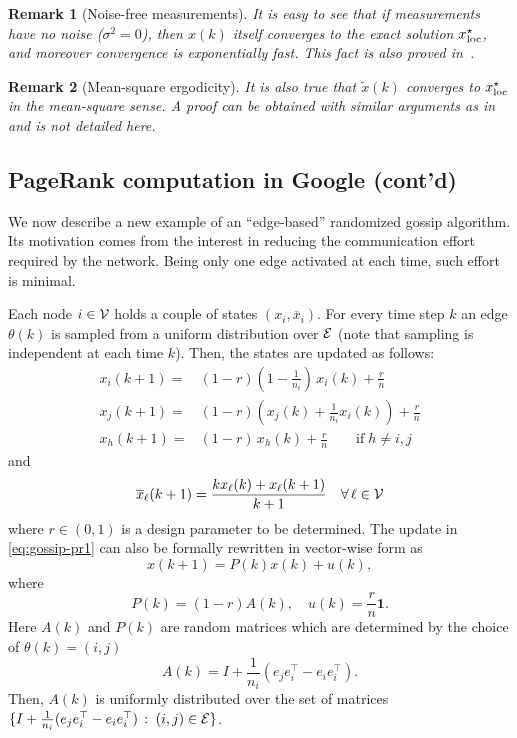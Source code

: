 \documentclass{IEEEtran}
\newtheorem{remark}{Remark}
\newcommand{\setdef}[2]{\{#1 \, : \; #2\}}
\newcommand{\1}{\mathbf{1}} \newcommand{\ind}{\mathds{1}}
\begin{document}
\begin{remark}[Noise-free measurements]\label{rem:noise-free-localization}
It is easy to see that if measurements have no noise ($\sigma^2=0$), then $x(k)$ itself converges to the exact solution ${x_{\textup{loc}}^{\star}}$, and moreover convergence is exponentially fast. This fact is also proved in~\cite{NMF-AZ:12}.
\end{remark}

\begin{remark}[Mean-square ergodicity]
It is also true that $\widetilde{x}(k)$ converges to ${x_{\textup{loc}}^{\star}}$ in the mean-square sense. 
A proof can be obtained with similar arguments as in~\cite{CR-PF-HI-RT:13a} and is not detailed here.
\end{remark}

\subsection{PageRank computation in Google (cont'd)}\label{sect:random-pagerank}




We now describe a new example of an ``edge-based'' randomized gossip algorithm. Its motivation comes from the interest in reducing the communication effort required by the network. Being only one edge activated at each time, such effort is minimal. 

Each node $i\in\mathcal{V}$ holds a couple of states $(x_i,\overline{x}_i)$. For every time step $k$ an edge $\theta(k)$ is sampled from a uniform distribution over $\mathcal{E}$ (note that sampling is independent at each time $k$).
Then, the states are updated as follows:
\begin{subequations}\label{eq:gossip-pr1}
\begin{align} 
x_i(k+1)=&(1-r) \left(1-\frac1{n_i}\right)\, x_i(k)+ \frac{r}{n}\\
x_j(k+1)=&(1-r) \left(x_j(k)+\frac1{n_i} x_i(k)\right)+ \frac{r}{n}\\
x_h(k+1)=&(1-r) \, x_h(k)+ \frac{r}{n} \qquad \text{if}\; h\neq i,j \label{eq:gossip-pr1-3}
\end{align}
\end{subequations}
and
\begin{align} \label{eq:gossip-pr2}
\overline{x}_\ell(k+1)=\frac{kx_\ell(k)+x_\ell(k+1)}{k+1} \quad \forall\,\ell\in \mathcal{V}
\end{align}
where $r\in(0,1)$ is a design parameter to be determined.
The update in \eqref{eq:gossip-pr1} can also be formally rewritten in vector-wise form as
$$ 
x(k+1)=P(k) x(k)+u(k),
$$
where 
$$
P(k)=(1-r) A(k),\quad u(k)= \frac{r}n \1.
$$ 
Here $A(k)$ and $P(k)$ are random matrices which are determined by the choice of $\theta(k)=(i,j)$
$$ 
A(k)=I+\frac1{n_i}(e_je_i^\top-e_ie_i^\top).
$$
Then, $A(k)$ is uniformly distributed over the set of matrices $\setdef{I+\frac1{n_i}(e_je_i^\top-e_ie_i^\top)}{(i,j)\in \E}$.
\end{document}

